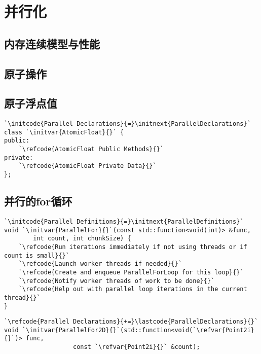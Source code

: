 \section{并行化}\label{sec:并行化}

\subsection{内存连续模型与性能}\label{sub:内存连续模型与性能}

\subsection{原子操作}\label{sub:原子操作}

\subsection{原子浮点值}\label{sub:原子浮点值}
\begin{lstlisting}
`\initcode{Parallel Declarations}{=}\initnext{ParallelDeclarations}`
class `\initvar{AtomicFloat}{}` {
public:
    `\refcode{AtomicFloat Public Methods}{}`
private:
    `\refcode{AtomicFloat Private Data}{}`
};
\end{lstlisting}

\subsection{并行的for循环}\label{sub:并行的for循环}
\begin{lstlisting}
`\initcode{Parallel Definitions}{=}\initnext{ParallelDefinitions}`
void `\initvar{ParallelFor}{}`(const std::function<void(int)> &func,
        int count, int chunkSize) {
    `\refcode{Run iterations immediately if not using threads or if count is small}{}`
    `\refcode{Launch worker threads if needed}{}`
    `\refcode{Create and enqueue ParallelForLoop for this loop}{}`
    `\refcode{Notify worker threads of work to be done}{}`
    `\refcode{Help out with parallel loop iterations in the current thread}{}`
}
\end{lstlisting}

\begin{lstlisting}
`\refcode{Parallel Declarations}{+=}\lastcode{ParallelDeclarations}{}`
void `\initvar{ParallelFor2D}{}`(std::function<void(`\refvar{Point2i}{}`)> func,
                   const `\refvar{Point2i}{}` &count);
\end{lstlisting}